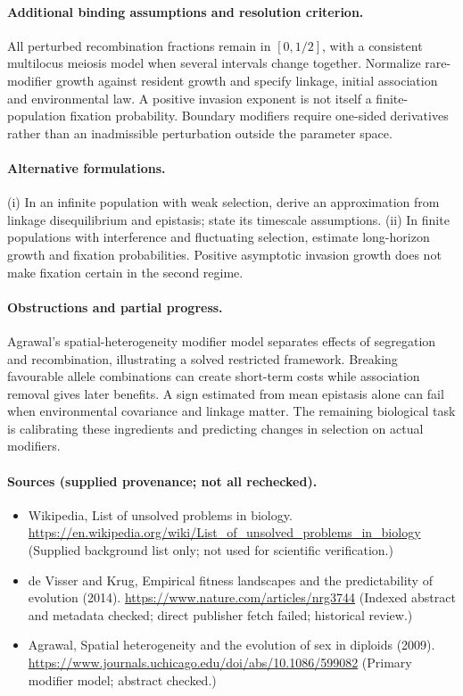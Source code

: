 \documentclass[11pt]{article}
\begin{document}
\paragraph{Additional binding assumptions and resolution criterion.} All perturbed recombination fractions remain in $[0,1/2]$, with a consistent multilocus meiosis model when several intervals change together. Normalize rare-modifier growth against resident growth and specify linkage, initial association and environmental law. A positive invasion exponent is not itself a finite-population fixation probability. Boundary modifiers require one-sided derivatives rather than an inadmissible perturbation outside the parameter space.

\paragraph{Alternative formulations.} (i) In an infinite population with weak selection, derive an approximation from linkage disequilibrium and epistasis; state its timescale assumptions. (ii) In finite populations with interference and fluctuating selection, estimate long-horizon growth and fixation probabilities. Positive asymptotic invasion growth does not make fixation certain in the second regime.
\paragraph{Obstructions and partial progress.} Agrawal's spatial-heterogeneity modifier model separates effects of segregation and recombination, illustrating a solved restricted framework. Breaking favourable allele combinations can create short-term costs while association removal gives later benefits. A sign estimated from mean epistasis alone can fail when environmental covariance and linkage matter. The remaining biological task is calibrating these ingredients and predicting changes in selection on actual modifiers.
\paragraph{Sources (supplied provenance; not all rechecked).} \begin{itemize}
\item Wikipedia, List of unsolved problems in biology. \url{https://en.wikipedia.org/wiki/List_of_unsolved_problems_in_biology} (Supplied background list only; not used for scientific verification.)
\item de Visser and Krug, Empirical fitness landscapes and the predictability of evolution (2014). \url{https://www.nature.com/articles/nrg3744} (Indexed abstract and metadata checked; direct publisher fetch failed; historical review.)
\item Agrawal, Spatial heterogeneity and the evolution of sex in diploids (2009). \url{https://www.journals.uchicago.edu/doi/abs/10.1086/599082} (Primary modifier model; abstract checked.)
\end{itemize}
\end{document}
